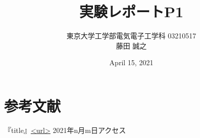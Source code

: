 \documentclass[a4j,dvipdfmx]{article}
\title{実験レポートP1}
\author{東京大学工学部電気電子工学科 03210517\\ 藤田 誠之 }
\date{April 15, 2021}
\begin{document}
\maketitle

\section{参考文献}
『title』\url{<url>} 2021年n月m日アクセス
\end{document}

